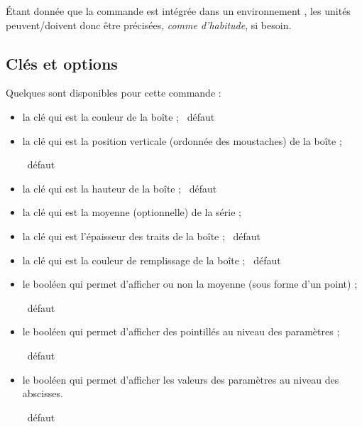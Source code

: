 \begin{PresCodePL}{}
\end{PresCodePL}

\begin{noteblock}
Étant donnée que la commande est intégrée dans un environnement \TikZ, les unités peuvent/doivent donc être précisées, \textit{comme d'habitude}, si besoin.
\end{noteblock}

\subsection{Clés et options}

\begin{cautionblock}
Quelques  sont disponibles pour cette commande :

\begin{itemize}
\item la clé  qui est la couleur de la boîte ; \hfill~défaut 
\item la clé  qui est la position verticale (ordonnée des moustaches) de la boîte ;

\hfill~défaut 
\item la clé  qui est la hauteur de la boîte ; \hfill~défaut 
\item la clé  qui est la moyenne (optionnelle) de la série ;
\item la clé  qui est l'épaisseur des traits de la boîte ; \hfill~défaut 
\item la clé  qui est la couleur de remplissage de la boîte ; \hfill~défaut 
\item le booléen  qui permet d'afficher ou non la moyenne (sous forme d'un point) ;

\hfill~défaut 
\item le booléen  qui permet d'afficher des pointillés au niveau des paramètres ;

\hfill~défaut 
\item le booléen  qui permet d'afficher les valeurs des paramètres au niveau des abscisses.

\hfill~défaut 
\end{itemize}
\vspace*{-\baselineskip}\leavevmode
\end{cautionblock}

